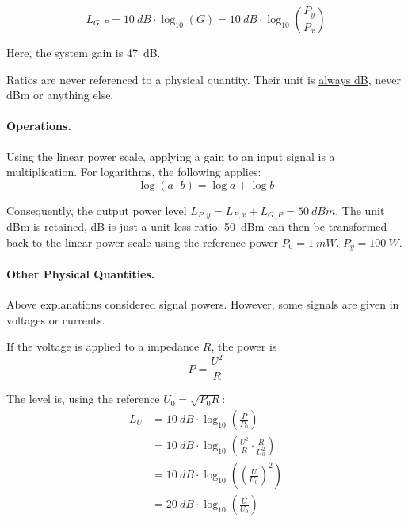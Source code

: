 \begin{refsection}
\begin{equation}
	L_{G,P} = \SI{10}{dB} \cdot \log_{10} \left(G\right) = \SI{10}{dB} \cdot \log_{10} \left(\frac{P_y}{P_x}\right)
\end{equation}

Here, the system gain is \SI{47}{dB}.

\begin{attention}
	Ratios are never referenced to a physical quantity. Their unit is \underline{always \si{dB}}, never \si{dBm} or anything else.
\end{attention}

\paragraph{Operations.}

Using the linear power scale, applying a gain to an input signal is a multiplication. For logarithms, the following applies:
\begin{equation}
	\log \left(a \cdot b\right) = \log a + \log b
\end{equation}

Consequently, the output power level $L_{P,y} = L_{P,x} + L_{G,P} = \SI{50}{dBm}$. The unit \si{dBm} is retained, \si{dB} is just a unit-less ratio. \SI{50}{dBm} can then be transformed back to the linear power scale using the reference power $P_0 = \SI{1}{mW}$. $P_y = \SI{100}{W}$.

\paragraph{Other Physical Quantities.}

Above explanations considered signal powers. However, some signals are given in voltages or currents.

If the voltage is applied to a impedance $R$, the power is
\begin{equation}
	P = \frac{U^2}{R}
\end{equation}

The level is, using the reference $U_0 = \sqrt{P_0 R}$:
\begin{equation}
	\begin{split}
		L_U &= \SI{10}{dB} \cdot \log_{10} \left(\frac{P}{P_0}\right) \\
		 &= \SI{10}{dB} \cdot \log_{10} \left(\frac{U^2}{R} \cdot \frac{R}{U_0^2}\right) \\
		 &= \SI{10}{dB} \cdot \log_{10} \left(\left(\frac{U}{U_0}\right)^2\right) \\
		 &= \SI{20}{dB} \cdot \log_{10} \left(\frac{U}{U_0}\right) \\
	\end{split}
\end{equation}


\end{refsection}

